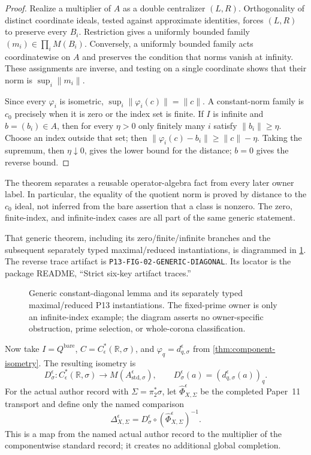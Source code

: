\documentclass[11pt]{article}
\theoremstyle{definition}
\newcommand{\R}{\mathbb R}
\newcommand{\Qbare}{Q^{\mathrm{bare}}}
\begin{document}
\begin{proof}
Realize a multiplier of $A$ as a double centralizer $(L,R)$.  Orthogonality
of distinct coordinate ideals, tested against approximate identities,
forces $(L,R)$ to preserve every $B_i$.  Restriction gives a uniformly
bounded family $(m_i)\in\prod_i M(B_i)$.  Conversely, a uniformly bounded
family acts coordinatewise on $A$ and preserves the condition that norms
vanish at infinity.  These assignments are inverse, and testing on a single
coordinate shows that their norm is $\sup_i\lVert m_i\rVert$.

Since every $\varphi_i$ is isometric,
$\sup_i\lVert\varphi_i(c)\rVert=\lVert c\rVert$.  A constant-norm family is
$c_0$ precisely when it is zero or the index set is finite.  If $I$ is
infinite and $b=(b_i)\in A$, then for every $\eta>0$ only finitely many
$i$ satisfy $\lVert b_i\rVert\geq\eta$.  Choose an index outside that set;
then
$\lVert\varphi_i(c)-b_i\rVert\geq\lVert c\rVert-\eta$.  Taking the
supremum, then $\eta\downarrow0$, gives the lower bound for the distance;
$b=0$ gives the reverse bound.
\end{proof}

The theorem separates a reusable operator-algebra fact from every later
owner label.  In particular, the equality of the quotient norm is proved by
distance to the $c_0$ ideal, not inferred from the bare assertion that a
class is nonzero.  The zero, finite-index, and infinite-index cases are all
part of the same generic statement.

That generic theorem, including its zero/finite/infinite branches and the
subsequent separately typed maximal/reduced instantiations, is diagrammed in
\cref{fig:generic-diagonal}.  The reverse trace artifact is
\nolinkurl{P13-FIG-02-GENERIC-DIAGONAL}.  Its locator is the package README,
``Strict six-key artifact traces.''

\begin{figure}[t]
\centering
\resizebox{\linewidth}{!}{}
\caption{Generic constant-diagonal lemma and its separately typed
maximal/reduced P13 instantiations.  The fixed-prime owner is only an
infinite-index example; the diagram asserts no owner-specific obstruction,
prime selection, or whole-corona classification.}
\label{fig:generic-diagonal}
\end{figure}

Now take $I=\Qbare$, $C=C^*_{\epsilon}(\R,\sigma)$, and
$\varphi_q=d_{q,\sigma}^{\epsilon}$ from
\cref{thm:component-isometry}.  The resulting isometry is
\[
 D_\sigma^{\epsilon}:C^*_{\epsilon}(\R,\sigma)
 \longrightarrow M(A_{\mathrm{std},\sigma}^{\epsilon}),
 \qquad
 D_\sigma^{\epsilon}(a)=(d_{q,\sigma}^{\epsilon}(a))_q.
\]
For the actual author record with $\Sigma=\pi_2^*\sigma$, let
$\widehat\Phi_{X,\Sigma}^{\epsilon}$ be the completed Paper~11 transport and
define only the named comparison
\[
 \Delta_{X,\Sigma}^{\epsilon}
   =D_\sigma^{\epsilon}\circ
     (\widehat\Phi_{X,\Sigma}^{\epsilon})^{-1}.
\]
This is a map from the named actual author record to the multiplier of the
componentwise standard record; it creates no additional global completion.
\end{document}

